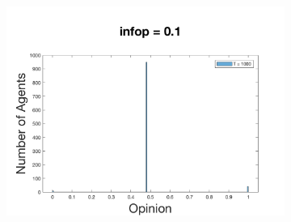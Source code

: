 \documentclass[11pt]{article}
\begin{document}
\begin{figure}[!htb]
\begin{subfigure}[t]{\textwidth}
\endminipage\hfill
{}
  \includegraphics[width=\linewidth]{p_20/gen_plot_201712171361168753e+01.png}
\endminipage
\end{subfigure}



\end{figure}
\end{document}

